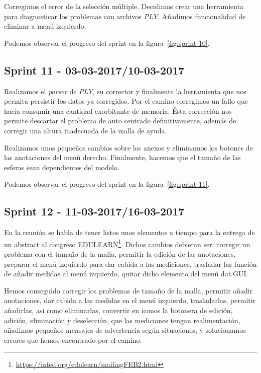 Corregimos el error de la selección múltiple. Decidimos crear una herramienta para diagnosticar los problemas con archivos \textit{PLY}. Añadimos funcionalidad de eliminar a menú izquierdo.

Podemos observar el progreso del sprint en la figura~\ref{fig:sprint-10}.

\subsection{Sprint 11 - 03-03-2017/10-03-2017}
Realizamos el \textit{parser} de \textit{PLY}, su corrector y finalmente la herramienta que nos permita persistir los datos ya corregidos. Por el camino corregimos un fallo que hacía consumir una cantidad exorbitante de memoria. Ésta corrección nos permite descartar el problema de auto centrado definitivamente, además de corregir una altura inadecuada de la malla de ayuda.

Realizamos unos pequeños cambios sobre los anexos y eliminamos los botones de las anotaciones del menú derecho. Finalmente, hacemos que el tamaño de las esferas sean dependientes del modelo.

Podemos observar el progreso del sprint en la figura~\ref{fig:sprint-11}.

\subsection{Sprint 12 - 11-03-2017/16-03-2017}
En la reunión se habla de tener listos unos elementos a tiempo para la entrega de un abstract al congreso EDULEARN\footnote{\url{https://iated.org/edulearn/mailingFEB2.html}}. Dichos cambios debieran ser: corregir un problema con el tamaño de la malla, permitir la edición de las anotaciones, preparar el menú izquierdo para dar cabida a las mediciones, trasladar las función de añadir medidas al menú izquierdo, quitar dicho elemento del menú dat.GUI.

Hemos conseguido corregir los problemas de tamaño de la malla, permitir añadir anotaciones, dar cabida a las medidas en el menú izquierdo, trasladarlas, permitir añadirlas, así como eliminarlas, convertir en iconos la botonera de edición, adición, eliminación y deselección, que las mediciones tengan realimentación, añadimos pequeños mensajes de advertencia según situaciones, y solucionamos errores que hemos encontrado por el camino.


